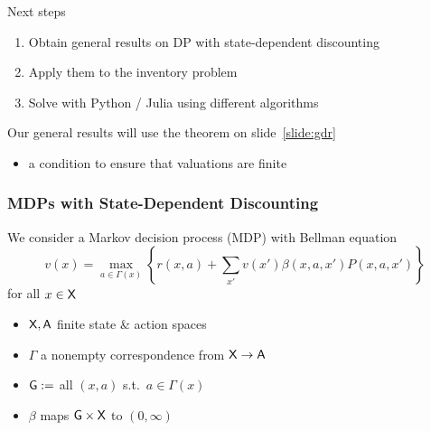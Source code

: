 \documentclass[xcolor=tex,dvipsnames]{beamer}
\begin{document}
\begin{frame}

    Next steps

    \begin{enumerate}
        \item Obtain general results on DP with state-dependent
            discounting
        \vspace{0.4em}
        \vspace{0.4em}
        \item Apply them to the inventory problem
        \vspace{0.4em}
        \vspace{0.4em}
        \item Solve with Python / Julia using different algorithms
    \end{enumerate}

        \vspace{0.4em}
        \vspace{0.4em}
        \vspace{0.4em}
        \vspace{0.4em}
        \vspace{0.4em}

    Our general results will use the theorem on slide~\ref{slide:gdr}

    \begin{itemize}
        \item a condition to ensure that valuations are finite
    \end{itemize}

\end{frame}


\begin{frame}
    \frametitle{MDPs with State-Dependent Discounting}
    
    We consider a Markov decision process (MDP) with Bellman equation
    \begin{equation*}
        v(x) =
        \max_{a \in \Gamma(x)}
        \left\{
            r(x, a) + \sum_{x'} v(x') \beta(x, a, x') P(x, a, x')
        \right\}
    \end{equation*}
    for all $x \in \mathsf X$

    \vspace{0.4em}
    \begin{itemize}
        \item $\mathsf X, \mathsf A$ finite state \& action spaces
    \vspace{0.4em}
        \item $\Gamma$ a nonempty correspondence from $\mathsf X \to \mathsf A$
    \vspace{0.4em}
        \item $\mathsf G :=$ all $(x,a)$ s.t.\ $a \in \Gamma(x)$
    \vspace{0.4em}
        \item $\beta$ maps $\mathsf G \times \mathsf X$ to $(0, \infty)$
    \end{itemize}
\end{frame}
\end{document}
